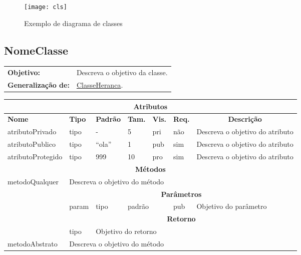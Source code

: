 \documentclass[12pt,openright,a4paper,brazil]{abntex2}
\begin{document}
\begin{figure}[!h]
	\centering
	\texttt{[image: cls]}
	\caption{Exemplo de diagrama de classes}
	\label{fig:cls}
\end{figure}

\clearpage
\subsection{NomeClasse}
\label{cls:NomeClasse}

\begin{tabular}{p{.25\linewidth}p{.7\linewidth}}
	\textbf{Objetivo:} & Descreva o objetivo da classe. \\
	\textbf{Generalização de:} & \hyperref[cls:ClasseHeranca]{ClasseHeranca}.
\end{tabular}

\begin{table}[h]
	\tiny
	\setlength\extrarowheight{5pt}
	\begin{tabular}{p{}p{}p{}p{}p{}p{}p{}}
		\hline
		\multicolumn{7}{c}{\textbf{Atributos}} \\
		\hline
		\centering \textbf{Nome} & \centering \textbf{Tipo} & \centering \textbf{Padrão} & \textbf{Tam.} & \textbf{Vis.} & \textbf{Req.} & \multicolumn{1}{c}{\textbf{Descrição}} \\ \hline
		atributoPrivado & tipo & - & 5 & pri & não & Descreva o objetivo do atributo \\
		atributoPublico & tipo & ``ola'' & 1 & pub & sim & Descreva o objetivo do atributo \\ 
		atributoProtegido & tipo & 999 & 10 & pro & sim & Descreva o objetivo do atributo \\ \hline
		
		\multicolumn{7}{c}{\textbf{Métodos}} \\ \hline
		\multirow{5}{*}{metodoQualquer} & \multicolumn{6}{l}{Descreva o objetivo do método} \\ \cline{2-7}
		& \multicolumn{6}{c}{\textbf{Parâmetros}} \\ \cline{2-7}
		& param & tipo & \multicolumn{2}{l}{padrão} & pub & Objetivo do parâmetro \\ \cline{2-7}
		& \multicolumn{6}{c}{\textbf{Retorno}} \\ \cline{2-7}
		& tipo &  \multicolumn{5}{l}{Objetivo do retorno} \\ \hline
		
		metodoAbstrato & \multicolumn{6}{l}{Descreva o objetivo do método} \\ \hline
	\end{tabular} 
\end{table}	
\end{document}
